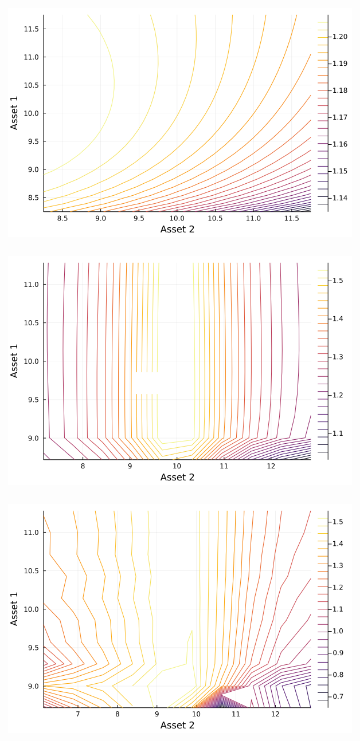 \documentclass{article}
\begin{document}
\begin{figure}
    \centering
    \begin{subfigure}{0.4\textwidth}
        \includegraphics[width=\textwidth]{../plots/params/baseline/entropy_upper.png}
        \end{subfigure}
    \begin{subfigure}{0.4\textwidth}
        \includegraphics[width=\textwidth]{../plots/params/a2-mean-shift/entropy_upper.png}
    \end{subfigure}
    \begin{subfigure}{0.4\textwidth}
        \includegraphics[width=\textwidth]{../plots/params/a2-meanvar-shift/entropy_upper.png}

\end{subfigure}
\end{figure}
\end{document}
